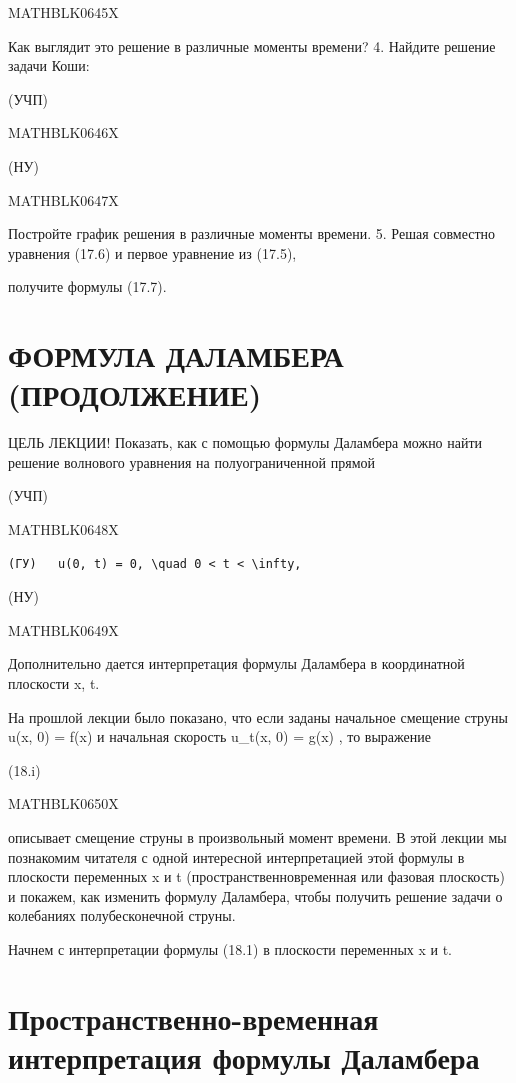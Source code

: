 \documentclass[
]{article}
\begin{document}
MATHBLK0645X

Как выглядит это решение в различные моменты времени? 4. Найдите решение
задачи Коши:

(УЧП)

MATHBLK0646X

(НУ)

MATHBLK0647X

Постройте график решения в различные моменты времени. 5. Решая совместно
уравнения (17.6) и первое уравнение из (17.5),

получите формулы (17.7).

\section{ФОРМУЛА ДАЛАМБЕРА
(ПРОДОЛЖЕНИЕ)}\label{ux444ux43eux440ux43cux443ux43bux430-ux434ux430ux43bux430ux43cux431ux435ux440ux430-ux43fux440ux43eux434ux43eux43bux436ux435ux43dux438ux435}

ЦЕЛЬ ЛЕКЦИИ! Показать, как с помощью формулы Даламбера можно найти
решение волнового уравнения на полуограниченной прямой

(УЧП)

MATHBLK0648X

\begin{verbatim}
(ГУ)   u(0, t) = 0, \quad 0 < t < \infty, 
\end{verbatim}

(НУ)

MATHBLK0649X

Дополнительно дается интерпретация формулы Даламбера в координатной
плоскости x, t.

На прошлой лекции было показано, что если заданы начальное смещение
струны u(x, 0) = f(x) и начальная скорость u\_t(x, 0) = g(x) , то
выражение

(18.i)

MATHBLK0650X

описывает смещение струны в произвольный момент времени. В этой лекции
мы познакомим читателя с одной интересной интерпретацией этой формулы в
плоскости переменных x и t (пространственновременная или фазовая
плоскость) и покажем, как изменить формулу Даламбера, чтобы получить
решение задачи о колебаниях полубесконечной струны.

Начнем с интерпретации формулы (18.1) в плоскости переменных x и t.

\section{Пространственно-временная интерпретация формулы
Даламбера}\label{ux43fux440ux43eux441ux442ux440ux430ux43dux441ux442ux432ux435ux43dux43dux43e-ux432ux440ux435ux43cux435ux43dux43dux430ux44f-ux438ux43dux442ux435ux440ux43fux440ux435ux442ux430ux446ux438ux44f-ux444ux43eux440ux43cux443ux43bux44b-ux434ux430ux43bux430ux43cux431ux435ux440ux430}
\end{document}
